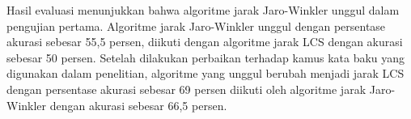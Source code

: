 Hasil evaluasi menunjukkan bahwa algoritme jarak Jaro-Winkler unggul dalam pengujian pertama. Algoritme jarak Jaro-Winkler unggul dengan persentase akurasi sebesar 55,5 persen, diikuti dengan algoritme jarak LCS dengan akurasi sebesar 50 persen. Setelah dilakukan perbaikan terhadap kamus kata baku yang digunakan dalam penelitian, algoritme yang unggul berubah menjadi jarak LCS dengan persentase akurasi sebesar 69 persen diikuti oleh algoritme jarak Jaro-Winkler dengan akurasi sebesar 66,5 persen.


